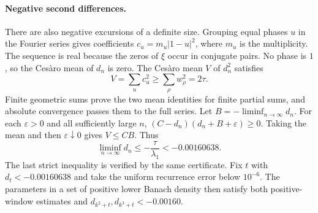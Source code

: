 \paragraph{Negative second differences.}
There are also negative excursions of a definite size. Grouping
equal phases $u$ in the Fourier series gives coefficients
$c_u=m_u |1-u|^2$, where $m_u$ is the multiplicity. The sequence
is real because the zeros of $\xi$ occur in conjugate pairs. No phase
is $1$, so the Cesàro mean of $d_n$ is zero. The Cesàro mean $V$
of $d_n^2$ satisfies
\[
 V=\sum_u c_u^2 \ge \sum_\rho w_\rho^2=2\tau .
\]
Finite geometric sums prove the two mean identities for finite
partial sums, and absolute convergence passes them to the full
series. Let $B=-\liminf_{n\to\infty}d_n$. For each $\varepsilon>0$
and all sufficiently large $n$, $(C-d_n)(d_n+B+\varepsilon)\ge0$.
Taking the mean and then $\varepsilon\downarrow0$ gives $V\le CB$.
Thus
\[
 \liminf_{n\to\infty}d_n\le-\frac{\tau}{\lambda_1}<-0.00160638 .
\]
The last strict inequality is verified by the same certificate. Fix
$t$ with $d_t<-0.00160638$ and take the uniform recurrence error below
$10^{-6}$. The parameters in a set of positive lower Banach density
then satisfy both positive-window estimates and
$d_{k^2+t},d_{k^3+t}<-0.00160$.
